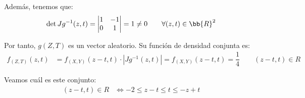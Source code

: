 \documentclass[12pt]{article}
\begin{document}
\begin{ejercicio}
\begin{enumerate}
            Además, tenemos que:
            \begin{equation*}
                \det Jg^{-1}(z,t) = \begin{vmatrix}
                    1 & -1\\
                    0 & 1
                \end{vmatrix} = 1\neq 0\qquad \forall (z,t)\in \bb{R}^2
            \end{equation*}

            Por tanto, $g(Z,T)$ es un vector aleatorio. Su función de densidad conjunta es:
            \begin{align*}
                f_{(Z,T)}(z,t) &= f_{(X,Y)}(z-t,t) \cdot |Jg^{-1}(z,t)| = f_{(X,Y)}(z-t,t) = \dfrac{1}{4}\qquad (z-t,t)\in R
            \end{align*}

            Veamos cuál es este conjunto:
            \begin{align*}
                (z-t,t) \in R &\Longleftrightarrow -2\leq z-t\leq t\leq -z+t
            \end{align*}

        \end{enumerate}
    \end{ejercicio}
\end{document}
